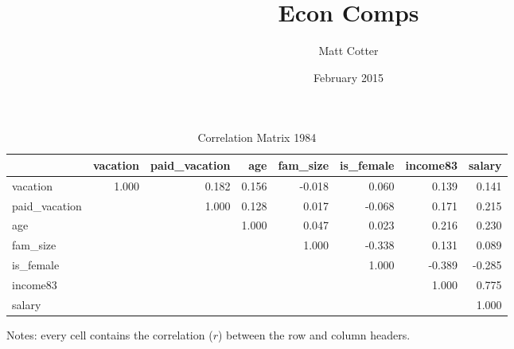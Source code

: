 \documentclass{article}
\title{Econ Comps}
\author{Matt Cotter}
\date{February 2015}
\begin{document}
    \setlength{\extrarowheight}{3pt}
    \begin{table}[h]
    \centering
    \hspace*{-1.5cm}
    \begin{tabular}{l|r|r|r|r|r|r|r}
                     & vacation & paid\_vacation &   age & fam\_size & is\_female & income83 & salary \\ \hline
      vacation       &    1.000 &          0.182 & 0.156 &    -0.018 &      0.060 &    0.139 &  0.141 \\ \hline
      paid\_vacation &          &          1.000 & 0.128 &     0.017 &     -0.068 &    0.171 &  0.215 \\ \hline
      age            &          &                & 1.000 &     0.047 &      0.023 &    0.216 &  0.230 \\ \hline
      fam\_size      &          &                &       &     1.000 &     -0.338 &    0.131 &  0.089 \\ \hline
      is\_female     &          &                &       &           &      1.000 &   -0.389 & -0.285 \\ \hline
      income83       &          &                &       &           &            &    1.000 &  0.775 \\ \hline
      salary         &          &                &       &           &            &          &  1.000
    \end{tabular}
    \hspace*{-1.5cm}
    \caption{Correlation Matrix 1984}
    \label{1984-correlation}
      Notes: every cell contains the correlation ($r$) between the row and column headers.
    \end{table}
    \setlength{\extrarowheight}{3pt}
\end{document}
